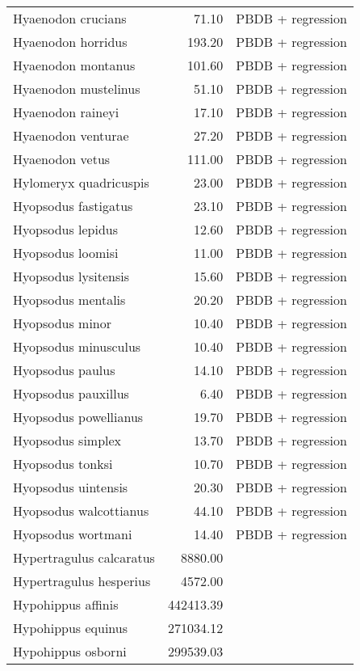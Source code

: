 \begin{table}[ht]
\begin{tabular}{lrl}
  Hyaenodon crucians & 71.10 & PBDB + regression \\ 
  Hyaenodon horridus & 193.20 & PBDB + regression \\ 
  Hyaenodon montanus & 101.60 & PBDB + regression \\ 
  Hyaenodon mustelinus & 51.10 & PBDB + regression \\ 
  Hyaenodon raineyi & 17.10 & PBDB + regression \\ 
  Hyaenodon venturae & 27.20 & PBDB + regression \\ 
  Hyaenodon vetus & 111.00 & PBDB + regression \\ 
  Hylomeryx quadricuspis & 23.00 & PBDB + regression \\ 
  Hyopsodus fastigatus & 23.10 & PBDB + regression \\ 
  Hyopsodus lepidus & 12.60 & PBDB + regression \\ 
  Hyopsodus loomisi & 11.00 & PBDB + regression \\ 
  Hyopsodus lysitensis & 15.60 & PBDB + regression \\ 
  Hyopsodus mentalis & 20.20 & PBDB + regression \\ 
  Hyopsodus minor & 10.40 & PBDB + regression \\ 
  Hyopsodus minusculus & 10.40 & PBDB + regression \\ 
  Hyopsodus paulus & 14.10 & PBDB + regression \\ 
  Hyopsodus pauxillus & 6.40 & PBDB + regression \\ 
  Hyopsodus powellianus & 19.70 & PBDB + regression \\ 
  Hyopsodus simplex & 13.70 & PBDB + regression \\ 
  Hyopsodus tonksi & 10.70 & PBDB + regression \\ 
  Hyopsodus uintensis & 20.30 & PBDB + regression \\ 
  Hyopsodus walcottianus & 44.10 & PBDB + regression \\ 
  Hyopsodus wortmani & 14.40 & PBDB + regression \\ 
  Hypertragulus calcaratus & 8880.00 & \cite{McKenna2011} \\ 
  Hypertragulus hesperius & 4572.00 & \cite{McKenna2011} \\ 
  Hypohippus affinis & 442413.39 & \cite{Tomiya2013} \\ 
  Hypohippus equinus & 271034.12 & \cite{Tomiya2013} \\ 
  Hypohippus osborni & 299539.03 & \cite{Tomiya2013} \\ 

\end{tabular}
\end{table}
